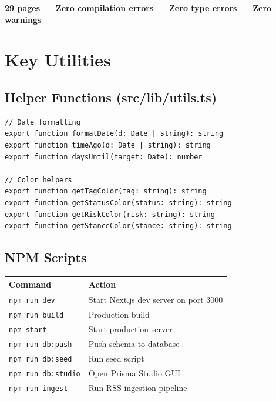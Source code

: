 \documentclass[12pt,a4paper]{article}
\begin{document}
\begin{successbox}
\textbf{29 pages — Zero compilation errors — Zero type errors — Zero warnings}
\end{successbox}

\newpage

\section{Key Utilities}

\subsection{Helper Functions (src/lib/utils.ts)}

\begin{lstlisting}[caption={Utility Functions}]
// Date formatting
export function formatDate(d: Date | string): string
export function timeAgo(d: Date | string): string
export function daysUntil(target: Date): number

// Color helpers
export function getTagColor(tag: string): string
export function getStatusColor(status: string): string
export function getRiskColor(risk: string): string
export function getStanceColor(stance: string): string
\end{lstlisting}

\subsection{NPM Scripts}

\begin{center}
\begin{tabular}{ll}
\toprule
\textbf{Command} & \textbf{Action} \\
\midrule
\texttt{npm run dev} & Start Next.js dev server on port 3000 \\
\texttt{npm run build} & Production build \\
\texttt{npm start} & Start production server \\
\texttt{npm run db:push} & Push schema to database \\
\texttt{npm run db:seed} & Run seed script \\
\texttt{npm run db:studio} & Open Prisma Studio GUI \\
\texttt{npm run ingest} & Run RSS ingestion pipeline \\
\bottomrule
\end{tabular}
\end{center}
\end{document}
